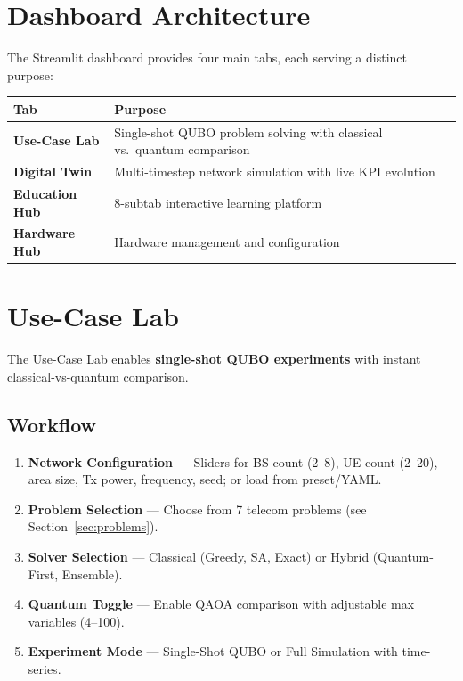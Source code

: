 \documentclass[11pt,a4paper]{article}
\begin{document}
\section{Dashboard Architecture}

The Streamlit dashboard provides four main tabs, each serving a distinct purpose:

\begin{center}
\begin{tabularx}{0.95\textwidth}{lX}
  \toprule
  \textbf{Tab} & \textbf{Purpose} \\
  \midrule
  \textbf{Use-Case Lab} & Single-shot QUBO problem solving with classical vs.\ quantum comparison \\
  \textbf{Digital Twin} & Multi-timestep network simulation with live KPI evolution \\
  \textbf{Education Hub} & 8-subtab interactive learning platform \\
  \textbf{Hardware Hub} & Hardware management and configuration \\
  \bottomrule
\end{tabularx}
\end{center}


\section{Use-Case Lab}
\label{sec:usecase}

The Use-Case Lab enables \textbf{single-shot QUBO experiments} with instant classical-vs-quantum comparison.

\subsection{Workflow}

\begin{enumerate}
  \item \textbf{Network Configuration} — Sliders for BS count (2--8), UE count (2--20), area size, Tx power, frequency, seed; or load from preset/YAML.
  \item \textbf{Problem Selection} — Choose from 7 telecom problems (see Section~\ref{sec:problems}).
  \item \textbf{Solver Selection} — Classical (Greedy, SA, Exact) or Hybrid (Quantum-First, Ensemble).
  \item \textbf{Quantum Toggle} — Enable QAOA comparison with adjustable max variables (4--100).
  \item \textbf{Experiment Mode} — Single-Shot QUBO or Full Simulation with time-series.
\end{enumerate}
\end{document}
